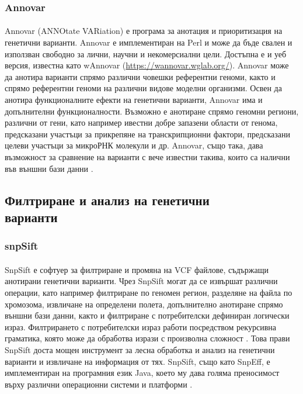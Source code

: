 \documentclass[pdftex,cyrillic,14pt,a4page,twoside,openright]{extreport}
\begin{document}
\subsubsection{Annovar}
\paragraph{}
Annovar (ANNOtate VARiation) е програма за анотация и приоритизация на генетични варианти. Annovar е имплементиран на Perl и може да бъде свален и използван свободно за лични, научни и некомерсиални цели. Достъпна е и уеб версия, известна като wAnnovar (\url{https://wannovar.wglab.org/}). Annovar може да анотира варианти спрямо различни човешки референтни геноми, както и спрямо референтни геноми на различни видове моделни организми. Освен да анотира функционалните ефекти на генетични варианти, Annovar има и допълнителни функционалности. Възможно е анотиране спрямо геномни региони, различни от гени, като например ивестни добре запазени области от генома, предсказани участъци за прикрепяне на транскрипционни фактори, предсказани целеви участъци за микроРНК молекули и др. Annovar, също така, дава възможност за сравнение на варианти с вече известни такива, които са налични във външни бази данни \cite{wang2010}.

\subsection[Филтриране и анализ на генетични варианти]{Филтриране и анализ на генетични\\ варианти}
\subsubsection{snpSift}
\paragraph{}
SnpSift е софтуер за филтриране и промяна на VCF файлове, съдържащи анотирани генетични варианти. Чрез SnpSift могат да се извършат различни операции, като например филтриране по геномен регион, разделяне на файла по хромозома, извличане на определени полета, допълнително анотиране спрямо външни бази данни, както и филтриране с потребителски дефиниран логически израз. Филтрирането с потребителски израз работи посредством рекурсивна граматика, която може да обработва изрази с произволна сложност \cite{cingolani2012sift}. Това прави SnpSift доста мощен инструмент за лесна обработка и анализ на генетични варианти и извличане на информация от тях. SnpSift, също като SnpEff, е имплементиран на програмния език Java, което му дава голяма преносимост върху различни операционни системи и платформи \cite[стр. 9-10]{schildt2020complete}.
\end{document}
